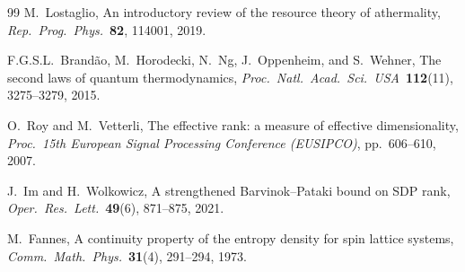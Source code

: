 \documentclass[11pt,a4paper]{article}
\theoremstyle{definition}
\begin{document}
\begin{thebibliography}{99}
  M.~Lostaglio,
  An introductory review of the resource theory of athermality,
  \emph{Rep.\ Prog.\ Phys.}\ \textbf{82}, 114001, 2019.

  F.G.S.L.~Brand\~{a}o, M.~Horodecki, N.~Ng, J.~Oppenheim,
  and S.~Wehner,
  The second laws of quantum thermodynamics,
  \emph{Proc.\ Natl.\ Acad.\ Sci.\ USA}\ \textbf{112}(11),
  3275--3279, 2015.

  O.~Roy and M.~Vetterli,
  The effective rank: a measure of effective dimensionality,
  \emph{Proc.\ 15th European Signal Processing Conference (EUSIPCO)},
  pp.~606--610, 2007.

  J.~Im and H.~Wolkowicz,
  A strengthened Barvinok--Pataki bound on SDP rank,
  \emph{Oper.\ Res.\ Lett.}\ \textbf{49}(6), 871--875, 2021.

  M.~Fannes,
  A continuity property of the entropy density for spin lattice systems,
  \emph{Comm.\ Math.\ Phys.}\ \textbf{31}(4), 291--294, 1973.

\end{thebibliography}
\end{document}
